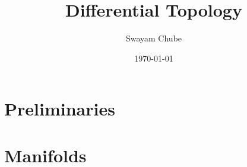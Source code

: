 \documentclass{report}
\title{Differential Topology}
\author{Swayam Chube}
\date{\today}
\begin{document}
\maketitle
\tableofcontents

\setcounter{chapter}{-1}

\chapter{Preliminaries}


\chapter{Manifolds}

\end{document}
